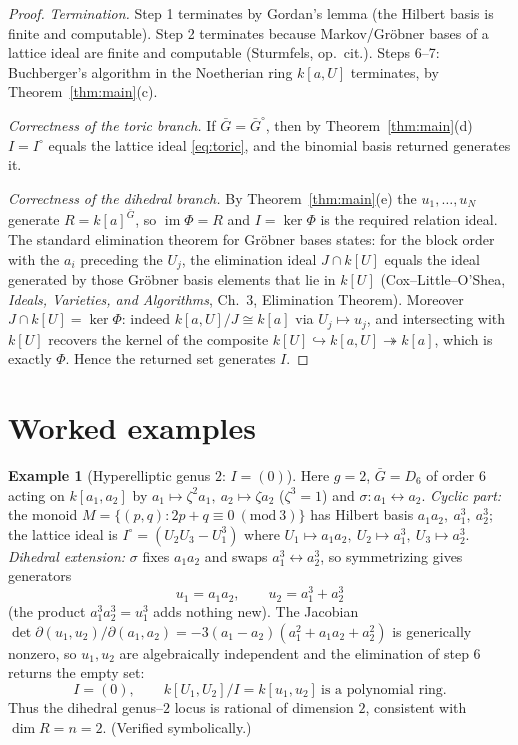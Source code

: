 \documentclass{amsart}
\theoremstyle{definition}
\newtheorem{example}[theorem]{Example}
\DeclareMathOperator{\im}{im}
\begin{document}
\begin{proof}
\emph{Termination.} Step 1 terminates by Gordan's lemma (the Hilbert basis is finite
and computable). Step 2 terminates because Markov/Gr\"obner bases of a lattice ideal
are finite and computable (Sturmfels, op.\ cit.). Steps 6--7: Buchberger's algorithm
in the Noetherian ring $k[a,U]$ terminates, by Theorem~\ref{thm:main}(c).

\emph{Correctness of the toric branch.} If $\bar G=\bar G^{\circ}$, then by
Theorem~\ref{thm:main}(d) $I=I^{\circ}$ equals the lattice ideal \eqref{eq:toric},
and the binomial basis returned generates it.

\emph{Correctness of the dihedral branch.} By Theorem~\ref{thm:main}(e) the
$u_1,\dots,u_N$ generate $R=k[a]^{\bar G}$, so $\im\Phi=R$ and $I=\ker\Phi$ is the
required relation ideal. The standard elimination theorem for Gr\"obner bases states:
for the block order with the $a_i$ preceding the $U_j$, the elimination ideal
$J\cap k[U]$ equals the ideal generated by those Gr\"obner basis elements that lie in
$k[U]$ (Cox--Little--O'Shea, \emph{Ideals, Varieties, and Algorithms}, Ch.~3,
Elimination Theorem). Moreover $J\cap k[U]=\ker\Phi$: indeed $k[a,U]/J\cong k[a]$ via
$U_j\mapsto u_j$, and intersecting with $k[U]$ recovers the kernel of the composite
$k[U]\hookrightarrow k[a,U]\twoheadrightarrow k[a]$, which is exactly $\Phi$. Hence
the returned set generates $I$.
\end{proof}

\section{Worked examples}

\begin{example}[Hyperelliptic genus $2$: $I=(0)$]\label{ex:g2}
Here $g=2$, $\bar G=D_6$ of order $6$ acting on $k[a_1,a_2]$ by
$a_1\mapsto\zeta^2a_1,\ a_2\mapsto\zeta a_2$ ($\zeta^3=1$) and $\sigma:a_1\leftrightarrow a_2$.
\emph{Cyclic part:} the monoid $M=\{(p,q):2p+q\equiv0\ (\mathrm{mod}\ 3)\}$ has Hilbert
basis $a_1a_2,\ a_1^3,\ a_2^3$; the lattice ideal is
$I^{\circ}=(U_2U_3-U_1^3)$ where $U_1\mapsto a_1a_2,\ U_2\mapsto a_1^3,\ U_3\mapsto a_2^3$.
\emph{Dihedral extension:} $\sigma$ fixes $a_1a_2$ and swaps $a_1^3\leftrightarrow a_2^3$,
so symmetrizing gives generators
\[
 u_1=a_1a_2,\qquad u_2=a_1^3+a_2^3
\]
(the product $a_1^3 a_2^3=u_1^3$ adds nothing new). The Jacobian
$\det\partial(u_1,u_2)/\partial(a_1,a_2)=-3(a_1-a_2)(a_1^2+a_1a_2+a_2^2)$ is
generically nonzero, so $u_1,u_2$ are algebraically independent and the elimination
of step 6 returns the empty set:
\[
 \boxed{I=(0)},\qquad k[U_1,U_2]/I=k[u_1,u_2]\ \text{is a polynomial ring}.
\]
Thus the dihedral genus--$2$ locus is rational of dimension $2$, consistent with
$\dim R=n=2$. (Verified symbolically.)
\end{example}
\end{document}
